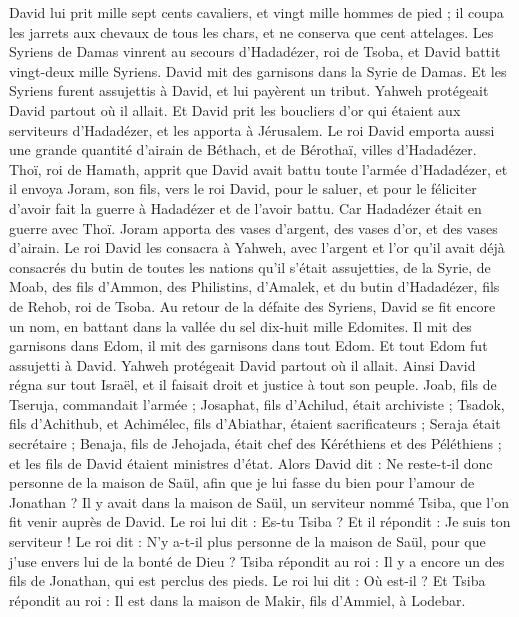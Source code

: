 \begin{multicols}{2}
David lui prit mille sept cents cavaliers, et vingt mille hommes de pied ; il coupa les jarrets aux chevaux de tous les chars, et ne conserva que cent attelages.
Les Syriens de Damas vinrent au secours d'Hadadézer, roi de Tsoba, et David battit vingt-deux mille Syriens.
David mit des garnisons dans la Syrie de Damas. Et les Syriens furent assujettis à David, et lui payèrent un tribut. Yahweh protégeait David partout où il allait.
Et David prit les boucliers d'or qui étaient aux serviteurs d'Hadadézer, et les apporta à Jérusalem.
Le roi David emporta aussi une grande quantité d’airain de Béthach, et de Bérothaï, villes d'Hadadézer.
Thoï, roi de Hamath, apprit que David avait battu toute l’armée d’Hadadézer,
et il envoya Joram, son fils, vers le roi David, pour le saluer, et pour le féliciter d’avoir fait la guerre à Hadadézer et de l’avoir battu. Car Hadadézer était en guerre avec Thoï. Joram apporta des vases d'argent, des vases d'or, et des vases d’airain.
Le roi David les consacra à Yahweh, avec l'argent et l'or qu'il avait déjà consacrés du butin de toutes les nations qu'il s'était assujetties,
de la Syrie, de Moab, des fils d’Ammon, des Philistins, d’Amalek, et du butin d'Hadadézer, fils de Rehob, roi de Tsoba.
Au retour de la défaite des Syriens, David se fit encore un nom, en battant dans la vallée du sel dix-huit mille Edomites.
Il mit des garnisons dans Edom, il mit des garnisons dans tout Edom. Et tout Edom fut assujetti à David. Yahweh protégeait David partout où il allait.
Ainsi David régna sur tout Israël, et il faisait droit et justice à tout son peuple.
Joab, fils de Tseruja, commandait l'armée ; Josaphat, fils d'Achilud, était archiviste ;
Tsadok, fils d'Achithub, et Achimélec, fils d'Abiathar, étaient sacrificateurs ; Seraja était secrétaire ;
Benaja, fils de Jehojada, était chef des Kéréthiens et des Péléthiens ; et les fils de David étaient ministres d’état.
\VerseOne{}Alors David dit : Ne reste-t-il donc personne de la maison de Saül, afin que je lui fasse du bien pour l'amour de Jonathan ?
Il y avait dans la maison de Saül, un serviteur nommé Tsiba, que l’on fit venir auprès de David. Le roi lui dit : Es-tu Tsiba ? Et il répondit : Je suis ton serviteur !
Le roi dit : N'y a-t-il plus personne de la maison de Saül, pour que j'use envers lui de la bonté de Dieu ? Tsiba répondit au roi : Il y a encore un des fils de Jonathan, qui est perclus des pieds.
Le roi lui dit : Où est-il ? Et Tsiba répondit au roi : Il est dans la maison de Makir, fils d’Ammiel, à Lodebar.

\end{multicols}
